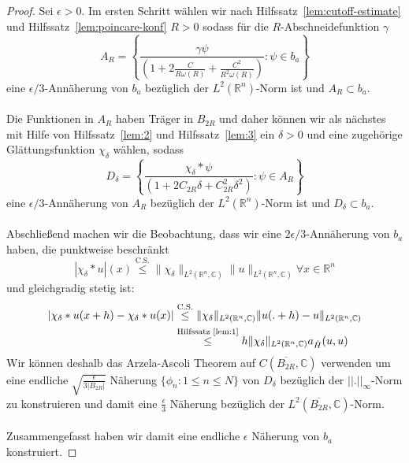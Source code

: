 \documentclass[11pt,a4paper,leqno]{report}
\numberwithin{equation}{chapter}
\begin{document}
\begin{proof}
	Sei $\epsilon>0$. Im ersten Schritt wählen wir nach Hilfssatz~\ref{lem:cutoff-estimate} und Hilfssatz~\ref{lem:poincare-konf} $R>0$ sodass für die $R$-Abschneidefunktion $\gamma$
	\begin{equation*} 
		A_R=\left\{\frac{\gamma\psi}{\left( 1 + 2\frac{C}{R\omega(R)} + \frac{C^2}{R^2\omega(R)} \right)}:\psi\in b_a\right\}
	\end{equation*}
	eine $\epsilon/3$-Annäherung von $b_{a}$ bezüglich der $L^2(\mathbb{R}^n)$-Norm  ist und $A_R\subset b_{a}$.\\
	\\
	Die Funktionen in $A_R$ haben Träger in $B_{2R}$ und daher können wir als nächstes mit Hilfe von Hilfssatz~\ref{lem:2} und Hilfssatz~\ref{lem:3} ein $\delta>0$ und eine zugehörige Glättungsfunktion $\chi_\delta$ wählen, sodass
	\begin{equation*} 
	D_\delta=\left\{\frac{\chi_\delta*\psi}{\left(1+2C_{2R}\delta+C_{2R}^2\delta^2 \right)}:\psi\in A_R\right\}
\end{equation*}
	eine $\epsilon/3$-Annäherung von $A_R$ bezüglich der $L^2(\mathbb{R}^n)$-Norm  ist und $D_\delta\subset b_{a}$.\\
\\
Abschließend machen wir die Beobachtung, dass wir eine $2\epsilon/3$-Annäherung von $b_a$ haben, die punktweise beschränkt
\begin{equation*}
	|\chi_{\delta} * u|(x)
	\overset{\text{C.S.}}{\leq}
	\|\chi_{\delta}\|_{L^2(\mathbb{R}^n,\mathbb{C})}
	\|u\|_{L^2(\mathbb{R}^n,\mathbb{C})}\forall x \in \mathbb{R}^n
\end{equation*}
 und gleichgradig stetig ist:
 \begin{align*}
 	|\chi_{\delta} * u(x+h)-\chi_{\delta} * u(x)|
 	&\overset{\text{C.S.}}{\leq}
 	\|\chi_{\delta}\|_{L^2(\mathbb{R}^n,\mathbb{C})}
 	\|u(.+h)-u\|_{L^2(\mathbb{R}^n,\mathbb{C})}\\
 	&\overset{\text{Hilfssatz~\ref{lem:1}}}{\leq}h \|\chi_{\delta}\|_{L^2(\mathbb{R}^n,\mathbb{C})}a_{\hat{H}}(u,u)
 \end{align*}
Wir können deshalb das Arzela-Ascoli Theorem auf $C(\overline{B_{2R}},\mathbb{C})$ verwenden um eine endliche $\sqrt{\frac{\epsilon}{3|B_{2R}|}}$ Näherung $\{\phi_n: 1\leq n\leq N\}$ von $D_\delta$ bezüglich der $||.||_\infty$-Norm zu konstruieren und damit eine $\frac{\epsilon}{3}$ Näherung bezüglich der $L^2(\overline{B_{2R}},\mathbb{C})$-Norm.\\
\\
Zusammengefasst haben wir damit eine endliche $\epsilon$ Näherung von $b_a$ konstruiert.
\end{proof}
\end{document}

